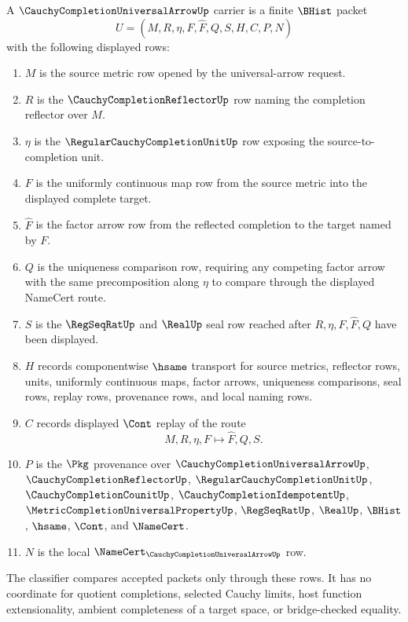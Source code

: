 \begin{definition}
\label{def:cauchy-completion-universal-arrow-carrier}
A $\CauchyCompletionUniversalArrowUp$ carrier is a finite $\BHist$ packet
$$
U=(M,R,\eta,F,\widehat{F},Q,S,H,C,P,N)
$$
with the following displayed rows:
\begin{enumerate}
\item $M$ is the source metric row opened by the universal-arrow request.
\item $R$ is the $\CauchyCompletionReflectorUp$ row naming the completion reflector over $M$.
\item $\eta$ is the $\RegularCauchyCompletionUnitUp$ row exposing the source-to-completion unit.
\item $F$ is the uniformly continuous map row from the source metric into the displayed complete target.
\item $\widehat{F}$ is the factor arrow row from the reflected completion to the target named by $F$.
\item $Q$ is the uniqueness comparison row, requiring any competing factor arrow with the same precomposition along $\eta$ to compare through the displayed NameCert route.
\item $S$ is the $\RegSeqRatUp$ and $\RealUp$ seal row reached after $R,\eta,F,\widehat{F},Q$ have been displayed.
\item $H$ records componentwise $\hsame$ transport for source metrics, reflector rows, units, uniformly continuous maps, factor arrows, uniqueness comparisons, seal rows, replay rows, provenance rows, and local naming rows.
\item $C$ records displayed $\Cont$ replay of the route
$$
M,R,\eta,F \longmapsto \widehat{F},Q,S .
$$
\item $P$ is the $\Pkg$ provenance over $\CauchyCompletionUniversalArrowUp$, $\CauchyCompletionReflectorUp$, $\RegularCauchyCompletionUnitUp$, $\CauchyCompletionCounitUp$, $\CauchyCompletionIdempotentUp$, $\MetricCompletionUniversalPropertyUp$, $\RegSeqRatUp$, $\RealUp$, $\BHist$, $\hsame$, $\Cont$, and $\NameCert$.
\item $N$ is the local $\NameCert_{\CauchyCompletionUniversalArrowUp}$ row.
\end{enumerate}
The classifier compares accepted packets only through these rows. It has no coordinate for quotient completions, selected Cauchy limits, host function extensionality, ambient completeness of a target space, or bridge-checked equality.
\end{definition}

